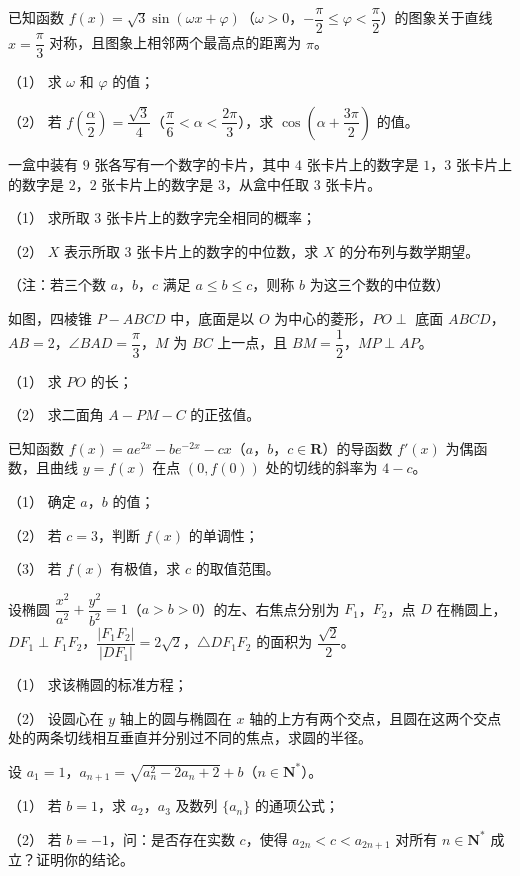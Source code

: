 \begin{question}
已知函数 $f(x)=\sqrt3\sin(\omega x+\varphi)$（$\omega>0$，$-\dfrac\pi2\leqslant\varphi<\dfrac\pi2$）的图象关于直线 $x=\dfrac\pi3$ 对称，且图象上相邻两个最高点的距离为 $\pi$。

（1） 求 $\omega$ 和 $\varphi$ 的值；

（2） 若 $f\left(\dfrac\alpha2\right)=\dfrac{\sqrt3}4$（$\dfrac\pi6<\alpha<\dfrac{2\pi}3$），求 $\cos\left(\alpha+\dfrac{3\pi}2\right)$ 的值。

\end{question}
\begin{question}
一盒中装有 $9$ 张各写有一个数字的卡片，其中 $4$ 张卡片上的数字是 $1$，$3$ 张卡片上的数字是 $2$，$2$ 张卡片上的数字是 $3$，从盒中任取 $3$ 张卡片。

（1） 求所取 $3$ 张卡片上的数字完全相同的概率；

（2） $X$ 表示所取 $3$ 张卡片上的数字的中位数，求 $X$ 的分布列与数学期望。

（注：若三个数 $a$，$b$，$c$ 满足 $a\leqslant b\leqslant c$，则称 $b$ 为这三个数的中位数）

\Needspace{0.4\textheight}
\end{question}
\begin{question}
如图，四棱锥 $P-ABCD$ 中，底面是以 $O$ 为中心的菱形，$PO\perp$ 底面 $ABCD$，$AB=2$，$\angle BAD=\dfrac\pi3$，$M$ 为 $BC$ 上一点，且 $BM=\dfrac12$，$MP\perp AP$。
\nopagebreak[4]
\begin{center}\end{center}
\nopagebreak[4]
（1） 求 $PO$ 的长；

（2） 求二面角 $A-PM-C$ 的正弦值。

\end{question}
\begin{question}
已知函数 $f(x)=ae^{2x}-be^{-2x}-cx$（$a$，$b$，$c\in\mathbf R$）的导函数 $f'(x)$ 为偶函数，且曲线 $y=f(x)$ 在点 $(0,f(0))$ 处的切线的斜率为 $4-c$。

（1） 确定 $a$，$b$ 的值；

（2） 若 $c=3$，判断 $f(x)$ 的单调性；

（3） 若 $f(x)$ 有极值，求 $c$ 的取值范围。

\Needspace{0.4\textheight}
\end{question}
\begin{question}
设椭圆 $\dfrac{x^2}{a^2}+\dfrac{y^2}{b^2}=1$（$a>b>0$）的左、右焦点分别为 $F_1$，$F_2$，点 $D$ 在椭圆上，$DF_1\perp F_1F_2$，$\dfrac{|F_1F_2|}{|DF_1|}=2\sqrt2$，$\triangle DF_1F_2$ 的面积为 $\dfrac{\sqrt2}2$。
\nopagebreak[4]
\begin{center}\end{center}
\nopagebreak[4]
（1） 求该椭圆的标准方程；

（2） 设圆心在 $y$ 轴上的圆与椭圆在 $x$ 轴的上方有两个交点，且圆在这两个交点处的两条切线相互垂直并分别过不同的焦点，求圆的半径。

\end{question}
\begin{question}
设 $a_1=1$，$a_{n+1}=\sqrt{a_n^2-2a_n+2}+b$（$n\in\mathbf N^*$）。

（1） 若 $b=1$，求 $a_2$，$a_3$ 及数列 $\{a_n\}$ 的通项公式；

（2） 若 $b=-1$，问：是否存在实数 $c$，使得 $a_{2n}<c<a_{2n+1}$ 对所有 $n\in\mathbf N^*$ 成立？证明你的结论。

\end{question}